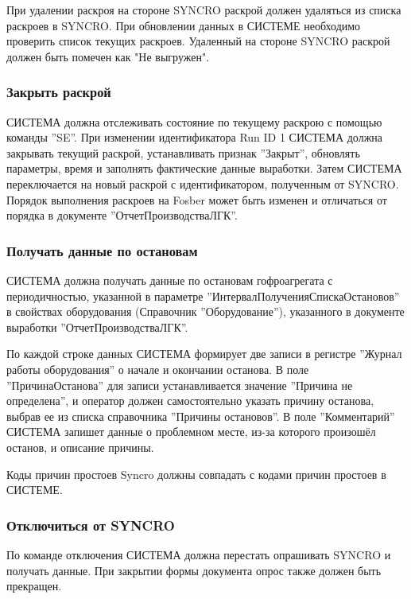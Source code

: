При удалении раскроя на стороне SYNCRO раскрой должен удаляться из списка раскроев в SYNCRO. При обновлении данных в СИСТЕМЕ необходимо проверить список текущих раскроев. Удаленный на стороне SYNCRO раскрой должен быть помечен как "Не выгружен". 


\subsubsection{Закрыть раскрой}

СИСТЕМА должна отслеживать состояние по текущему раскрою с помощью команды ''SE''.
При изменении идентификатора Run ID 1 СИСТЕМА должна закрывать текущий раскрой, устанавливать признак ''Закрыт'', обновлять параметры, время и заполнять фактические данные выработки. Затем СИСТЕМА переключается на новый раскрой с идентификатором, полученным от SYNCRO. Порядок выполнения раскроев на Fosber может быть изменен и отличаться от порядка в документе ''ОтчетПроизводстваЛГК''. 

\subsubsection{Получать данные по остановам}

СИСТЕМА должна получать данные по остановам гофроагрегата с периодичностью, указанной в параметре ''ИнтервалПолученияСпискаОстановов'' в свойствах оборудования (Справочник ''Оборудование''), указанного в документе выработки ''ОтчетПроизводстваЛГК''.

По каждой строке данных СИСТЕМА формирует две записи в регистре ''Журнал работы оборудования'' о начале и окончании останова. В поле ''ПричинаОстанова'' для записи устанавливается значение ''Причина не определена'', и оператор
должен самостоятельно указать причину останова, выбрав ее из списка справочника ''Причины остановов''. В поле ''Комментарий'' СИСТЕМА запишет данные о проблемном месте, из-за которого произошёл останов, и описание причины.

Коды причин простоев Syncro должны совпадать с кодами причин простоев в СИСТЕМЕ.

\subsubsection{Отключиться от SYNCRO}

По команде отключения СИСТЕМА должна перестать опрашивать SYNCRO и получать данные.
При закрытии формы документа опрос также должен быть прекращен.


